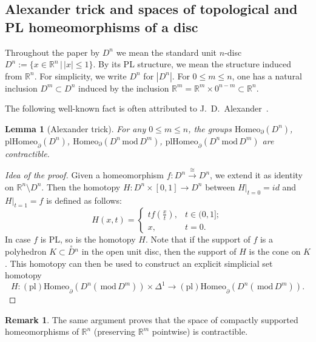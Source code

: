 \documentclass[11pt]{amsart}
\newtheorem{lemma}[theorem]{Lemma}
\theoremstyle{definition}
\newtheorem{remark}[theorem]{Remark}
\newcommand{\R}{{\mathbb R}}
\newcommand{\Homeo}{\mathrm{Homeo}}
\newcommand{\plHomeo}{\mathrm{plHomeo}}
\newcommand{\pdHomeo}{\mathrm{pdHomeo}}
\newcommand{\mmod}{\,\mathrm{mod}\,}
\numberwithin{equation}{section}
\begin{document}
\subsection{Alexander trick and spaces of topological and PL homeomorphisms of a disc}\label{ss:alex}
Throughout the paper by  $D^n$ we mean the standard unit $n$-disc  $D^n:=\{x\in\R^n\,|\, |x|\leq 1\}$. %
By its PL structure, we mean the structure induced from $\R^n$. 
For simplicity, we write $D^n$ for $|D^n|$.  
 For $0\leq m\leq n$, one has a natural inclusion $D^m\subset D^n$ induced by the inclusion $\R^m=\R^m\times 0^{n-m}\subset \R^n$.

The following well-known fact is often attributed to J.~D.~Alexander~\cite{Alex}.

\begin{lemma}[Alexander trick]\label{l:alex}
For any $0\leq m\leq n$, the groups $\Homeo_\partial(D^n)$, $\plHomeo_\partial(D^n)$, %
 $\Homeo_\partial(D^n\mmod D^m)$, 
$\plHomeo_\partial(D^n\mmod D^m)$ %
 are contractible.
\end{lemma} 

\begin{proof}[Idea of the proof]
Given a homeomorphism $f\colon D^n\xrightarrow{\cong}D^n$, we extend it as identity on $\R^n\setminus
D^n$. Then the homotopy $H\colon D^n\times [0,1]\to D^n$ between $H|_{t=0}=id$ and $H|_{t=1}=f$ is defined as follows:
\begin{equation}\label{eq:alex_h}
H(x,t)=
\begin{cases}
tf\left(\frac xt\right),& t\in (0,1];\\
x,& t=0.
\end{cases}
\end{equation}
In case $f$ is PL, so is the homotopy $H$.
Note that if the support of $f$ is a polyhedron $K\subset \overset{\circ}{D}{}^n$ in the open unit disc, then the support
of $H$  is the cone on $K$.  %
This homotopy can then be used to construct an explicit simplicial set homotopy
\[
H\colon \mathrm{(pl)Homeo}_\partial(D^n (\mmod D^m))\times\Delta^1\to  \mathrm{(pl)Homeo}_\partial(D^n (\mmod D^m)).
\]
\end{proof}

\begin{remark}\label{r:alex}
The same argument proves that the space of compactly supported homeomorphisms of $\R^n$ (preserving $\R^m$ pointwise) is contractible.
\end{remark}
\end{document}
